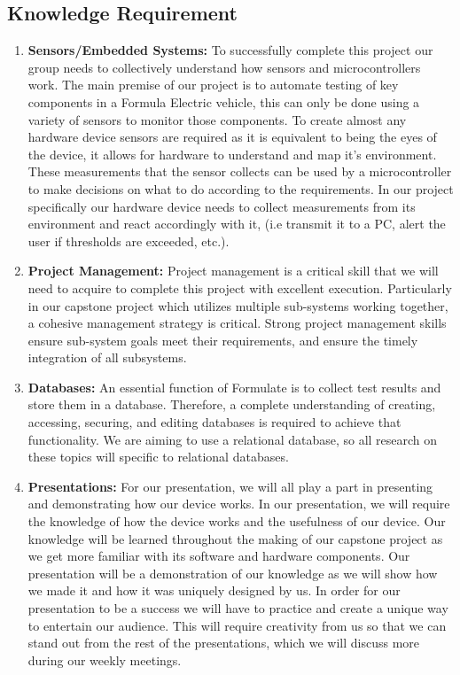 \documentclass[12pt,titlepage]{article}
\begin{document}
\subsection{Knowledge Requirement}
\begin{enumerate}
  \item \textbf{Sensors/Embedded Systems:} To successfully complete this project our group needs to collectively understand how sensors and microcontrollers work. The main premise of our project is to automate testing of key components in a Formula Electric vehicle, this can only be done using a variety of sensors to monitor those components. To create almost any hardware device sensors are required as it is equivalent to being the eyes of the device, it allows for hardware to understand and map it's environment. These measurements that the sensor collects can be used by a microcontroller to make decisions on what to do according to the requirements. In our project specifically our hardware device needs to collect measurements from its environment and react accordingly with it, (i.e transmit it to a PC, alert the user if thresholds are exceeded, etc.).
  
  \item \textbf{Project Management:} Project management is a critical skill that we will need to acquire to complete this project with excellent execution. Particularly in our capstone project which utilizes multiple sub-systems working together, a cohesive management strategy is critical. Strong project management skills ensure sub-system goals meet their requirements, and ensure the timely integration of all subsystems.
  
  \item \textbf{Databases:} An essential function of Formulate is to collect test results and store them in a database. Therefore, a complete understanding of creating, accessing, securing, and editing databases is required to achieve that functionality. We are aiming to use a relational database, so all research on these topics will specific to relational databases.
  
  \item \textbf{Presentations:} For our presentation, we will all play a part in presenting and demonstrating how our device works. In our presentation, we will require the knowledge of how the device works and the usefulness of our device. Our knowledge will be learned throughout the making of our capstone project as we get more familiar with its software and hardware components. Our presentation will be a demonstration of our knowledge as we will show how we made it and how it was uniquely designed by us. In order for our presentation to be a success we will have to practice and create a unique way to entertain our audience. This will require creativity from us so that we can stand out from the rest of the presentations, which we will discuss more during our weekly meetings.
  
\end{enumerate}
\end{document}
